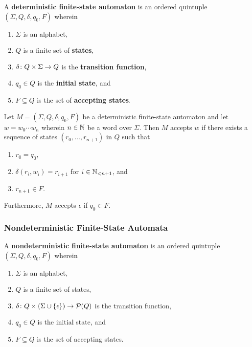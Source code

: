 \Bdf
    A {\bf deterministic finite-state automaton} is an ordered quintuple
    \((\Sigma, Q, \delta, q_0, F)\) wherein
    \begin{enumerate}
        \item \(\Sigma\) is an alphabet,
        \item \(Q\) is a finite set of {\bf states},
        \item \(\map{\delta}{Q \times \Sigma}{Q}\) is the {\bf transition
        function},
        \item \(q_0 \in Q\) is the {\bf initial state}, and
        \item \(F \subseteq Q\) is the set of {\bf accepting states}.
    \end{enumerate}
\Edf

Let \(M = (\Sigma, Q, \delta, q_0, F)\) be a deterministic finite-state
automaton and let \(w = w_0 \cdots w_n\) wherein \(n \in \setnat\) be a word
over \(\Sigma\).  Then \(M\) accepts \(w\) if there exists a sequence of states
\((r_0, \ldots, r_{n + 1})\) in \(Q\) such that
\begin{enumerate}
    \item \(r_0 = q_0\),
    \item \(\delta(r_i, w_i) = r_{i + 1}\) for \(i \in \Nln[n + 1]\), and
    \item \(r_{n + 1} \in F\).
\end{enumerate}
Furthermore, \(M\) accepts \(\epsilon\) if \(q_0 \in F\).

\subsubsection{Nondeterministic Finite-State Automata}

\Bdf
    A {\bf nondeterministic finite-state automaton} is an ordered quintuple
    \((\Sigma, Q, \delta, q_0, F)\) wherein
    \begin{enumerate}
        \item \(\Sigma\) is an alphabet,
        \item \(Q\) is a finite set of states,
        \item \(\map{\delta}{Q \times (\Sigma \cup \set{\epsilon})}{\pow(Q)}\)
        is the transition function,
        \item \(q_0 \in Q\) is the initial state, and
        \item \(F \subseteq Q\) is the set of accepting states.
    \end{enumerate}
\Edf

